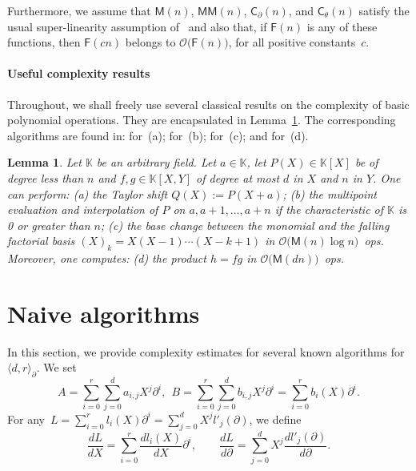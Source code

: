 \documentclass{sig-alt-full}
\newcommand{\x}{X}
\newcommand{\y}{Y}
\newcommand{\Tx}{\theta}
\newcommand{\Dx}{\partial}
\newcommand{\bigO}{{\mathcal{O}}}
\newcommand{\MM}{\mathsf{MM}}
\def\OMul#1#2#3{\langle #1,#2 \rangle_{#3}}
\newcommand{\sC}{\mathsf{C}}
\newcommand{\sM}{\mathsf{M}}
\newcommand{\bK}{\mathbb{K}}
\newcommand{\sF}{\mathsf{F}}
\newtheorem{lemma}{Lemma}
\begin{document}
Furthermore, we assume that $\sM(n)$, $\MM(n)$,  $\sC_\Dx(n)$, and $\sC_\Tx(n)$ satisfy the usual super-linearity assumption of~\cite[\S8.3, Eq.~(9)]{GaGe99} and also that, if $\sF(n)$ is any of these functions,  then $\sF(cn)$ belongs to $\bigO\bigl(\sF(n)\bigr)$, for all positive constants~$c$.





\paragraph*{Useful complexity results}
Throughout, we shall freely use several classical results on the complexity of basic polynomial operations.
They are encapsulated in Lemma~\ref{cost-results}.
The corresponding algorithms are found in: \cite[Algorithm~E]{GaGe97} for~(a); \cite[Chapter~10]{GaGe99} for~(b); \cite[Th.~2.4 and 2.5]{Gerhard00} for~(c); and \cite[Cor.~8.29]{GaGe99} for~(d).

\begin{lemma}\label{cost-results}
Let\/ $\bK$ be an arbitrary field. Let $a \in \bK$, let $P(\x) \in \bK[\x]$ be of degree less than $n$ and $f, g \in \bK[\x,\y]$ of degree at most $d$ in $\x$ and $n$ in $\y$.
One can perform:
\emph{(a)\/} the Taylor shift $Q(\x):=P(\x+a)$;
\emph{(b)\/} the multipoint evaluation and interpolation of $P$ on $a,a+1,\ldots,a+n$ if the characteristic of\/ $\bK$ is 0 or greater than $n$;
\emph{(c)\/} the base change between the monomial and  the falling factorial basis $(\x)_k=\x(\x-1)\cdots (\x-k+1)$
in $\bigO\bigl(\sM(n) \log n\bigr)$~ops.
Moreover, one computes:
\emph{(d)\/} the product $h=fg$ in $\bigO\bigl(\sM(dn)\bigr)$~ops.
\end{lemma}


\section{Naive algorithms}
\label{sec:naive-algos}

In this section, we provide complexity estimates for several known algorithms for~$\OMul dr\Dx$.
We set
\begin{equation*}
A=\sum_{i=0}^r\sum_{j=0}^da_{i,j}\x^j\Dx^i,\ \
B=\sum_{i=0}^r\sum_{j=0}^db_{i,j}\x^j\Dx^i=\sum_{i=0}^rb_i(\x)\Dx^i.
\end{equation*}
For any~$L=\sum_{i=0}^rl_i(\x)\Dx^i=\sum_{j=0}^d\x^jl'_j(\Dx)$, we define
\begin{equation*}
\frac{dL}{d\x} = \sum_{i=0}^r\frac{dl_i(\x)}{d\x}\Dx^i,\qquad
\frac{dL}{d\Dx} = \sum_{j=0}^d\x^j\frac{dl'_j(\Dx)}{d\Dx}.
\end{equation*}
\end{document}
